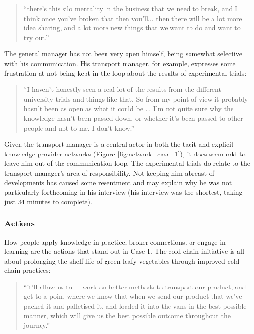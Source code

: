 \begin{quote}
\small
\enquote{there’s this silo mentality in the business that we need to break, and I think once you've broken that then you'll... then there will be a lot more idea sharing, and a lot more new things that we want to do and want to try out.} \\
\end{quote}

The general manager has not been very open himself, being somewhat selective with his communication. His transport manager, for example, expresses some frustration at not being kept in the loop about the results of experimental trials:

\begin{quote}
\small
\enquote{I haven't honestly seen a real lot of the results from the different university trials and things like that. So from my point of view it probably hasn't been as open as what it could be ... I'm not quite sure why the knowledge hasn't been passed down, or whether it's been passed to other people and not to me. I don't know.} \\
\end{quote}

Given the transport manager is a central actor in both the tacit and explicit knowledge provider networks (Figure \ref{fig:network_case_1}), it does seem odd to leave him out of the communication loop. The experimental trials do relate to the transport manager's area of responsibility. Not keeping him abreast of developments has caused some resentment and may explain why he was not particularly forthcoming in his interview (his interview was the shortest, taking just 34 minutes to complete). \medskip

\subsubsection{Actions}

How people apply knowledge in practice, broker connections, or engage in learning are the actions that stand out in Case 1. The cold-chain initiative is all about prolonging the shelf life of green leafy vegetables through improved cold chain practices:

\begin{quote}
\small
\enquote{it'll allow us to ... work on better methods to transport our product, and get to a point where we know that when we send our product that we've packed it and palletised it, and loaded it into the vans in the best possible manner, which will give us the best possible outcome throughout the journey.} \\
\end{quote}

